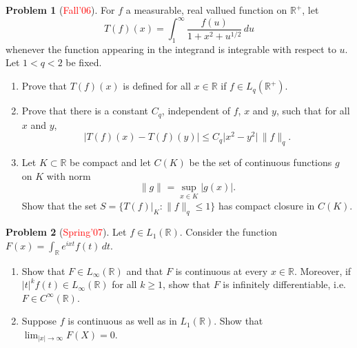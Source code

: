 \documentclass[12pt]{amsart}
\def\field#1{\mathbb{#1}}
\def\abs#1{\lvert {#1} \rvert}
\def\Lpnorm#1#2{\lVert {#1} \rVert_{#2}}
\theoremstyle{definition}
\newtheorem{problem}{Problem}
\theoremstyle{remark}
\begin{document}
\begin{problem}[\textcolor{red}{Fall'06}]
  For $f$ a measurable, real vallued function on $\field{R}^+$, let
  \begin{equation*}
    T(f)(x) = \int_1^\infty \frac{f(u)}{1+x^2+u^{1/2}}\, du
  \end{equation*}
  whenever the function appearing in the integrand is integrable with
  respect to $u$.  Let $1<q<2$ be fixed.
  \begin{enumerate}
  \item Prove that $T(f)(x)$ is defined for all $x \in \field{R}$ if
    $f \in L_q(\field{R}^+)$.
  \item Prove that there is a constant $C_q$, independent of $f$, $x$
    and $y$, such that for all $x$ and $y$,
    \begin{equation*}
      \abs{T(f)(x) - T(f)(y)} \leq C_q \abs{x^2 - y^2}\, \Lpnorm{f}{q}.
    \end{equation*}
  \item Let $K \subset \field{R}$ be compact and let $C(K)$ be the set
    of continuous functions $g$ on $K$ with norm
    \begin{equation*}
      \Lpnorm{g}{} = \sup_{x \in K} \abs{g(x)}.
    \end{equation*}
    Show that the set $S = \{ T(f)\big\rvert_{K} : \Lpnorm{f}{q} \leq
    1 \}$ has compact closure in $C(K)$.
  \end{enumerate}
\end{problem}
\begin{problem}[\textcolor{red}{Spring'07}]
  Let $f \in L_1(\field{R})$. Consider the function $F(x) =
  \int_{\field{R}} e^{ixt} f(t)\, dt$.
  \begin{enumerate}
  \item Show that $F \in L_\infty(\field{R})$ and that $F$ is
    continuous at every $x \in \field{R}$. Moreover, if $\abs{t}^k
    f(t) \in L_\infty(\field{R})$ for all $k \geq 1$, show that $F$ is
    infinitely differentiable, i.e.~$F \in C^\infty(\field{R})$.
  \item Suppose $f$ is continuous as well as in $L_1(\field{R})$. Show
    that $\lim_{\abs{x} \to \infty} F(X) = 0$.
  \end{enumerate}
\end{problem}
\end{document}
